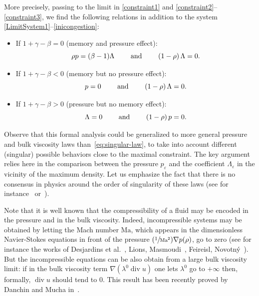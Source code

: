 \documentclass[10pt]{amsart}
\newcommand{\<}{\bigl\langle}
\renewcommand{\>}{\bigr\rangle}
\newcommand{\Psfrac}[2]{(\sfrac{#1}{#2})}
\theoremstyle{definition}
\theoremstyle{remark}
\DeclareMathOperator{\Div}{div}
\let\ep\varepsilon
\begin{document}
More precisely, passing to the limit in \eqref{constraint1} and \eqref{constraint2}--\eqref{constraint3}, we find the following relations in addition to the system \eqref{LimitSystem1}--\eqref{inicongestion}:
\begin{itemize}
\item If $1+\gamma -\beta=0$ (memory and pressure effect):
\begin{equation}\label{MPE}
\rho p = (\beta-1) \Lambda \qquad \hbox{ and } \qquad (1-\rho) \, \Lambda=0.
\end{equation}
\item If $1+\gamma - \beta <0$ (memory but no pressure effect):
\begin{equation}\label{MPPE}
p = 0 \qquad \hbox{ and } \qquad
(1-\rho)\, \Lambda= 0.
\end{equation}
\item If $1+\gamma -\beta>0$ (pressure but no memory effect):
\begin{equation} \label{PPME}
\Lambda=0
\qquad \hbox{ and } \qquad (1-\rho) \, p = 0.
\end{equation}
\end{itemize}

Observe that this formal analysis could be generalized to more general pressure and bulk viscosity laws than~\eqref{eq:singular-law}, to take into account different (singular) possible behaviors close to the maximal constraint.
The key argument relies here in the comparison between the pressure $p_\ep$ and the coefficient $\Lambda_\ep$ in the vicinity of the maximum density.
Let us emphasize the fact that there is no consensus in physics around the order of singularity of these laws (see for instance~\cite{andreotti2013} or~\cite{coussot2005}).

Note that it is well known that the compressibility of a fluid may be encoded in the pressure and in the bulk viscosity.
Indeed, incompressible systems may be obtained by letting the Mach number $\mathrm{Ma}$, which appears in the dimensionless Navier-Stokes equations in front of the pressure $\Psfrac{1}{\mathrm{Ma^2}}\nabla p(\rho)$, go
to zero (see for instance the works of {Desjardins} et al.~\cite{desjardins1999}, {Lions, Masmoudi}~\cite{lions1998Mach}, {Feireisl, Novotn{\'y}}~\cite{feireisl2009}).
But the incompressible equations can be also obtain from a large bulk viscosity limit:
if in the bulk viscosity term $\nabla(\lambda^0\Div u)$ one lets $\lambda^0$ go to $+\infty$ then, formally, $\Div u$ should tend to $0$.
This result has been recently proved by {Danchin} and {Mucha} in~\cite{danchin2017}.
\end{document}
